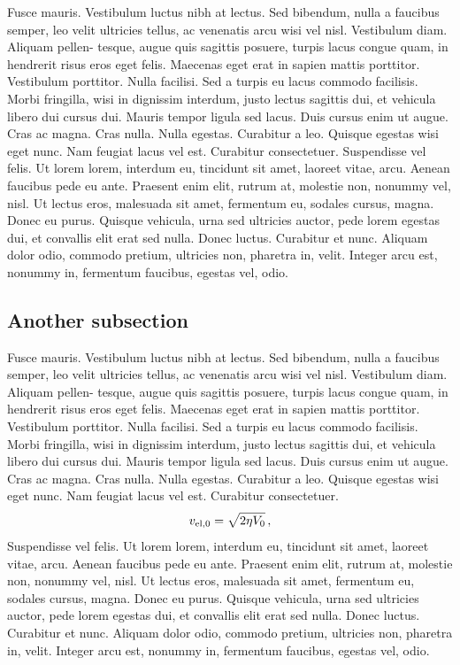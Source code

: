 Fusce mauris. Vestibulum luctus nibh at lectus. Sed bibendum, nulla a faucibus semper, leo velit ultricies tellus, ac venenatis arcu wisi vel nisl. Vestibulum diam. Aliquam pellen- tesque, augue quis sagittis posuere, turpis lacus congue quam, in hendrerit risus eros eget felis. Maecenas eget erat in sapien mattis porttitor. Vestibulum porttitor. Nulla facilisi. Sed a turpis eu lacus commodo facilisis. Morbi fringilla, wisi in dignissim interdum, justo lectus sagittis dui, et vehicula libero dui cursus dui. Mauris tempor ligula sed lacus. Duis cursus enim ut augue. Cras ac magna. Cras nulla. Nulla egestas. Curabitur a leo. Quisque egestas wisi eget nunc. Nam feugiat lacus vel est. Curabitur consectetuer.
Suspendisse vel felis. Ut lorem lorem, interdum eu, tincidunt sit amet, laoreet vitae, arcu. Aenean faucibus pede eu ante. Praesent enim elit, rutrum at, molestie non, nonummy vel, nisl. Ut lectus eros, malesuada sit amet, fermentum eu, sodales cursus, magna. Donec eu purus. Quisque vehicula, urna sed ultricies auctor, pede lorem egestas dui, et convallis elit erat sed nulla. Donec luctus. Curabitur et nunc. Aliquam dolor odio, commodo pretium, ultricies non, pharetra in, velit. Integer arcu est, nonummy in, fermentum faucibus, egestas vel, odio.



\subsection{Another subsection}

Fusce mauris. Vestibulum luctus nibh at lectus. Sed bibendum, nulla a faucibus semper, leo velit ultricies tellus, ac venenatis arcu wisi vel nisl. Vestibulum diam. Aliquam pellen- tesque, augue quis sagittis posuere, turpis lacus congue quam, in hendrerit risus eros eget felis. Maecenas eget erat in sapien mattis porttitor. Vestibulum porttitor. Nulla facilisi. Sed a turpis eu lacus commodo facilisis. Morbi fringilla, wisi in dignissim interdum, justo lectus sagittis dui, et vehicula libero dui cursus dui. Mauris tempor ligula sed lacus. Duis cursus enim ut augue. Cras ac magna. Cras nulla. Nulla egestas. Curabitur a leo. Quisque egestas wisi eget nunc. Nam feugiat lacus vel est. Curabitur consectetuer.
\begin{equation}
v_{{\rm el},0} = \sqrt{2 \eta V_0} \, , \label{velocity}
\end{equation}
Suspendisse vel felis. Ut lorem lorem, interdum eu, tincidunt sit amet, laoreet vitae, arcu. Aenean faucibus pede eu ante. Praesent enim elit, rutrum at, molestie non, nonummy vel, nisl. Ut lectus eros, malesuada sit amet, fermentum eu, sodales cursus, magna. Donec eu purus. Quisque vehicula, urna sed ultricies auctor, pede lorem egestas dui, et convallis elit erat sed nulla. Donec luctus. Curabitur et nunc. Aliquam dolor odio, commodo pretium, ultricies non, pharetra in, velit. Integer arcu est, nonummy in, fermentum faucibus, egestas vel, odio.

